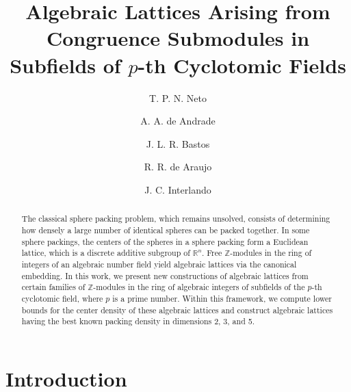 \documentclass{amsart}
\title{Algebraic Lattices Arising from Congruence Submodules in Subfields of $p$-th Cyclotomic Fields}
\author{T. P. N. Neto}
\author{A. A. de Andrade}
\author{J. L. R. Bastos}
\author{R. R. de Araujo}
\author{J. C. Interlando}
\begin{document}
\maketitle

\begin{abstract} The classical sphere packing problem, which remains unsolved, consists of determining how densely a large number of identical spheres can be packed together. In some sphere packings, the centers of the spheres in a sphere packing form a Euclidean lattice, which is a discrete additive subgroup of $\mathbb{R}^n$. Free $\mathbb{Z}$-modules in the ring of integers of an algebraic number field yield algebraic lattices via the canonical embedding. In this work, we present new constructions of algebraic lattices from certain families of $\mathbb{Z}$-modules in the ring of algebraic integers of subfields of the $p$-th cyclotomic field, where $p$ is a prime number. Within this framework, we compute lower bounds for the center density of these algebraic lattices and construct algebraic lattices having the best known packing density in dimensions 2, 3, and 5.
\end{abstract}

\section{Introduction} \label{sec-1}

\end{document}
